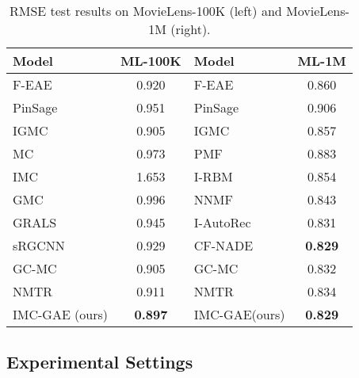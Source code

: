 \documentclass[sigconf]{acmart}
\begin{document}
\begin{table}
  \caption{RMSE test results on MovieLens-100K (left) and MovieLens-1M (right).}
  \label{tab:rmse_dense}
  \begin{tabular}{lc|lc}
    \toprule
    \textbf{Model}&\textbf{ML-100K}&\textbf{Model}&\textbf{ML-1M}\\
    \midrule
    F-EAE & 0.920 & F-EAE & 0.860\\
    PinSage & 0.951 & PinSage & 0.906\\
    IGMC & 0.905 & IGMC & 0.857\\
    \midrule
    MC & 0.973 & PMF & 0.883\\
    IMC & 1.653 & I-RBM & 0.854\\
    GMC & 0.996 & NNMF & 0.843\\
    GRALS   & 0.945 & I-AutoRec & 0.831\\
    sRGCNN & 0.929 & CF-NADE & \textbf{0.829}\\
    GC-MC & 0.905 & GC-MC &  0.832\\
    NMTR & 0.911 & NMTR & 0.834 \\
    IMC-GAE (ours) & \textbf{0.897} & IMC-GAE(ours) & \textbf{0.829}\\
  \bottomrule
\end{tabular}
\end{table}
\subsection{Experimental Settings}
\end{document}
